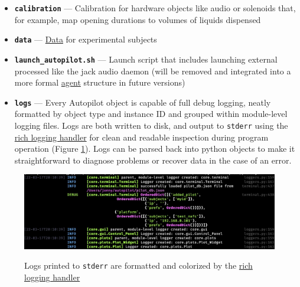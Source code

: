 \begin{itemize}
\item \textbf{\texttt{calibration}} --- Calibration for hardware objects like audio or solenoids that, for example, map opening durations to volumes of liquids dispensed
\item \textbf{\texttt{data}} --- \hyperref[sec:datamodel]{Data} for experimental subjects
\item \textbf{\texttt{launch\_autopilot.sh}} --- Launch script that includes launching external processed like the jack audio daemon (will be removed and integrated into a more formal \hyperref[sec:agents]{agent} structure in future versions)\\
\item \textbf{\texttt{logs}} --- Every Autopilot object is capable of full debug logging, neatly formatted by object type and instance ID and grouped within module-level logging files. Logs are both written to disk, and output to \texttt{stderr} using the \href{https://rich.readthedocs.io/en/latest/reference/logging.html#logging}{rich logging handler} for clean and readable inspection during program operation (Figure \ref{fig:logging}). Logs can be parsed back into python objects to make it straightforward to diagnose problems or recover data in the case of an error.
\end{itemize}
\begin{figure}
\includegraphics[width=\linewidth]{figures/logging.png}
\label{fig:logging}
\caption{Logs printed to \texttt{stderr} are formatted and colorized by the \href{https://rich.readthedocs.io/en/latest/reference/logging.html\#logging}{rich logging handler}}
\end{figure}


